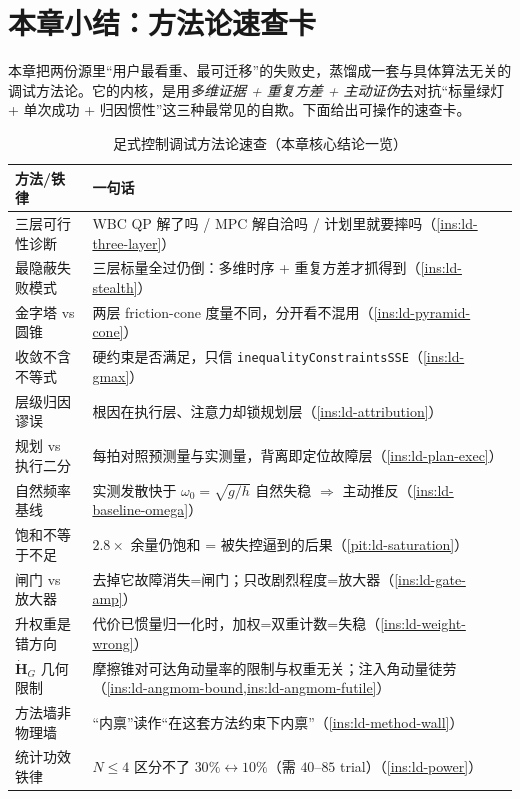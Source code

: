\section{本章小结：方法论速查卡}
\label{sec:ld-checklist}

本章把两份源里“用户最看重、最可迁移”的失败史，蒸馏成一套与具体算法无关的调试方法论。它的内核，是用\emph{多维证据 + 重复方差 + 主动证伪}去对抗“标量绿灯 + 单次成功 + 归因惯性”这三种最常见的自欺。下面给出可操作的速查卡。

\begin{table}[H]\centering\small
\caption{足式控制调试方法论速查（本章核心结论一览）}
\begin{tabular}{p{} p{}}
\toprule
方法/铁律 & 一句话 \\
\midrule
三层可行性诊断 & WBC QP 解了吗 / MPC 解自洽吗 / 计划里就要摔吗（\cref{ins:ld-three-layer}）\\
最隐蔽失败模式 & 三层标量全过仍倒：多维时序 + 重复方差才抓得到（\cref{ins:ld-stealth}）\\
金字塔 vs 圆锥 & 两层 friction-cone 度量不同，分开看不混用（\cref{ins:ld-pyramid-cone}）\\
收敛不含不等式 & 硬约束是否满足，只信 \texttt{inequalityConstraintsSSE}（\cref{ins:ld-gmax}）\\
层级归因谬误 & 根因在执行层、注意力却锁规划层（\cref{ins:ld-attribution}）\\
规划 vs 执行二分 & 每拍对照预测量与实测量，背离即定位故障层（\cref{ins:ld-plan-exec}）\\
自然频率基线 & 实测发散快于 $\omega_0=\sqrt{g/h}$ 自然失稳 $\Rightarrow$ 主动推反（\cref{ins:ld-baseline-omega}）\\
饱和不等于不足 & $2.8\times$ 余量仍饱和 = 被失控逼到的后果（\cref{pit:ld-saturation}）\\
闸门 vs 放大器 & 去掉它故障消失=闸门；只改剧烈程度=放大器（\cref{ins:ld-gate-amp}）\\
升权重是错方向 & 代价已惯量归一化时，加权=双重计数=失稳（\cref{ins:ld-weight-wrong}）\\
$\dot{\boldsymbol H}_G$ 几何限制 & 摩擦锥对可达角动量率的限制与权重无关；注入角动量徒劳（\cref{ins:ld-angmom-bound,ins:ld-angmom-futile}）\\
方法墙非物理墙 & “内禀”读作“在这套方法约束下内禀”（\cref{ins:ld-method-wall}）\\
统计功效铁律 & $N\le 4$ 区分不了 $30\%{\leftrightarrow}10\%$（需 $40$--$85$ trial）（\cref{ins:ld-power}）\\

\end{tabular}
\end{table}
